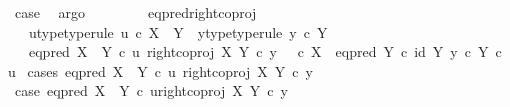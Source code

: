 \begin{isabellebody}
\ case{}\ \isamarkupfalse%
\ argo\isanewline
\ \ \ \ \isamarkupfalse%
\isanewline
\ \ \isamarkupfalse%
\isanewline
{}\isamarkupfalse%
%
\endisatagproof
{\isafoldproof}%
%
\isadelimproof
\isanewline
%
\endisadelimproof
\isanewline
{}\isamarkupfalse%
\ eq{\isacharunderscore}{\kern0pt}pred{\isacharunderscore}{\kern0pt}right{\isacharunderscore}{\kern0pt}coproj{\isacharcolon}{\kern0pt}\isanewline
\ \ \ u{\isacharunderscore}{\kern0pt}type{\isacharbrackleft}{\kern0pt}type{\isacharunderscore}{\kern0pt}rule{\isacharbrackright}{\kern0pt}{\isacharcolon}{\kern0pt}\ {\isachardoublequoteopen}u\ {\isasymin}\isactrlsub c\ X\ {\isasymCoprod}\ Y{\isachardoublequoteclose}\ \ y{\isacharunderscore}{\kern0pt}type{\isacharbrackleft}{\kern0pt}type{\isacharunderscore}{\kern0pt}rule{\isacharbrackright}{\kern0pt}{\isacharcolon}{\kern0pt}\ {\isachardoublequoteopen}y\ {\isasymin}\isactrlsub c\ Y{\isachardoublequoteclose}\isanewline
\ \ \ {\isachardoublequoteopen}eq{\isacharunderscore}{\kern0pt}pred\ {\isacharparenleft}{\kern0pt}X\ {\isasymCoprod}\ Y{\isacharparenright}{\kern0pt}\ {\isasymcirc}\isactrlsub c\ {\isasymlangle}u{\isacharcomma}{\kern0pt}\ right{\isacharunderscore}{\kern0pt}coproj\ X\ Y\ {\isasymcirc}\isactrlsub c\ y{\isasymrangle}\ {\isacharequal}{\kern0pt}\ {\isacharparenleft}{\kern0pt}{\isacharparenleft}{\kern0pt}{\isasymf}\ {\isasymcirc}\isactrlsub c\ {\isasymbeta}\isactrlbsub X\isactrlesub {\isacharparenright}{\kern0pt}\ {\isasymamalg}\ {\isacharparenleft}{\kern0pt}eq{\isacharunderscore}{\kern0pt}pred\ Y\ {\isasymcirc}\isactrlsub c\ {\isasymlangle}id\ Y{\isacharcomma}{\kern0pt}\ y\ {\isasymcirc}\isactrlsub c\ {\isasymbeta}\isactrlbsub Y\isactrlesub {\isasymrangle}{\isacharparenright}{\kern0pt}{\isacharparenright}{\kern0pt}\ {\isasymcirc}\isactrlsub c\ u{\isachardoublequoteclose}\isanewline
%
\isadelimproof
%
\endisadelimproof
%
\isatagproof
{}\isamarkupfalse%
\ {\isacharparenleft}{\kern0pt}cases\ {\isachardoublequoteopen}eq{\isacharunderscore}{\kern0pt}pred\ {\isacharparenleft}{\kern0pt}X\ {\isasymCoprod}\ Y{\isacharparenright}{\kern0pt}\ {\isasymcirc}\isactrlsub c\ {\isasymlangle}u{\isacharcomma}{\kern0pt}\ right{\isacharunderscore}{\kern0pt}coproj\ X\ Y\ {\isasymcirc}\isactrlsub c\ y{\isasymrangle}\ {\isacharequal}{\kern0pt}\ {\isasymt}{\isachardoublequoteclose}{\isacharparenright}{\kern0pt}\isanewline
\ \ \isamarkupfalse%
\ case{}{\isacharcolon}{\kern0pt}\ {\isachardoublequoteopen}eq{\isacharunderscore}{\kern0pt}pred\ {\isacharparenleft}{\kern0pt}X\ {\isasymCoprod}\ Y{\isacharparenright}{\kern0pt}\ {\isasymcirc}\isactrlsub c\ {\isasymlangle}u{\isacharcomma}{\kern0pt}right{\isacharunderscore}{\kern0pt}coproj\ X\ Y\ {\isasymcirc}\isactrlsub c\ y{\isasymrangle}\ {\isacharequal}{\kern0pt}\ {\isasymt}{\isachardoublequoteclose}\isanewline

\end{isabellebody}
